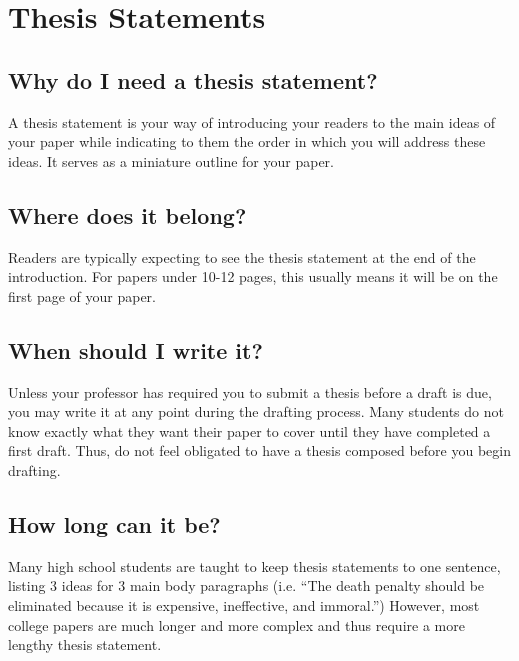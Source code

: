 
\chapter{Thesis Statements}

\section{Why do I need a thesis statement?}

A thesis statement is your way of introducing your readers to the main ideas of your paper while indicating to them the order in which you will address these ideas. It serves as a miniature outline for your paper.

\section{Where does it belong?}

Readers are typically expecting to see the thesis statement at the end of the introduction. For papers under 10-12 pages, this usually means it will be on the first page of your paper.

\section{When should I write it?}

Unless your professor has required you to submit a thesis before a draft is due, you may write it at any point during the drafting process. Many students do not know exactly what they want their paper to cover until they have completed a first draft. Thus, do not feel obligated to have a thesis composed before you begin drafting.

\section{How long can it be?}

Many high school students are taught to keep thesis statements to one sentence, listing 3 ideas for 3 main body paragraphs (i.e. ``The death penalty should be eliminated because it is expensive, ineffective, and immoral.'') However, most college papers are much longer and more complex and thus require a more lengthy thesis statement.

